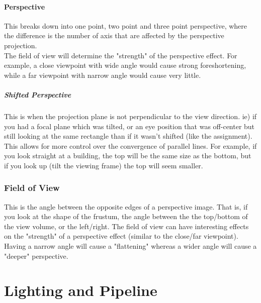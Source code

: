 \documentclass[12pt]{article}
\theoremstyle{definition}
\begin{document}
\subsection{Perspective}
This breaks down into one point, two point and three point perspective, where the difference is the number of axis that are affected by the perspective projection.
\\ \linebreak
The field of view will determine the "strength" of the perspective effect. For example, a close viewpoint with wide angle would cause strong foreshortening, while a far viewpoint with narrow angle would cause very little.
\subsubsection{Shifted Perspective}
This is when the projection plane is not perpendicular to the view direction. ie) if you had a focal plane which was tilted, or an eye position that was off-center but still looking at the same rectangle than if it wasn't shifted (like the assignment).
\\ \linebreak
This allows for more control over the convergence of parallel lines. For example, if you look straight at a building, the top will be the same size as the bottom, but if you look up (tilt the viewing frame) the top will seem smaller.

\section{Field of View}
This is the angle between the opposite edges of a perspective image. That is, if you look at the shape of the frustum, the angle between the the top/bottom of the view volume, or the left/right. The field of view can have interesting effects on the "strength" of a perspective effect (similar to the close/far viewpoint). Having a narrow angle will cause a "flattening" whereas a wider angle will cause a "deeper" perspective.

\part{Lighting and Pipeline}
\end{document}
